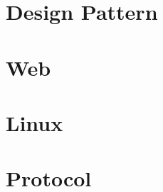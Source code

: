 \documentclass[12pt, oneside, b5paper]{book}
\begin{document}
\part{Design Pattern}


\part{Web}



\part{Linux}





\part{Protocol}


		
\newpage
\end{document}
